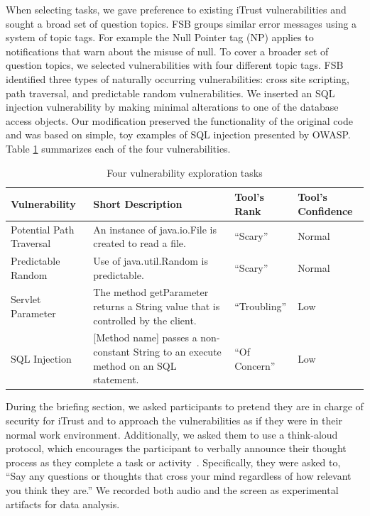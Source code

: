 \documentclass[conference]{IEEEtran}
\begin{document}
When selecting tasks, we gave preference to existing iTrust vulnerabilities and sought a broad set of question topics.  
FSB groups similar error messages using a system of topic tags. For example the Null Pointer tag (NP) applies to notifications that warn about the misuse of null. 
To cover a broader set of question topics, we selected vulnerabilities with four different topic tags.
FSB identified three types of naturally occurring vulnerabilities: cross site scripting, path traversal, and predictable random vulnerabilities.
We inserted an SQL injection vulnerability by making minimal alterations to one of the database access objects.
Our modification preserved the functionality of the original code and was based on simple, toy examples of SQL injection presented by OWASP.
Table \ref{table:vulnerabilities} summarizes each of the four vulnerabilities. 

\begin{table} 
\centering
\caption{Four vulnerability exploration tasks}
\begin{tabular}{|l|l|l|l|}
\rowcolor{gray!50}
\hline
    Vulnerability				& Short Description													& Tool's Rank 						& Tool's Confidence\\
    \hline	
    Potential Path Traversal	& An instance of java.io.File is created to read a file.     			& ``Scary''							 	&  Normal\\
    \hline
    Predictable Random			& Use of java.util.Random is predictable. 								& ``Scary''								&  Normal\\
    \hline
    Servlet Parameter 			& The method getParameter returns a String value that is controlled by the client.			& ``Troubling''		&  Low\\
    \hline
    SQL Injection				& [Method name] passes a non-constant String to an execute method on an SQL statement.     	& ``Of Concern''		&  Low\\
    \hline
\end{tabular}
\label{table:vulnerabilities}
\end{table}

During the briefing section, we asked participants to pretend they are in charge of security for iTrust and to approach the vulnerabilities as if they were in their normal work environment.
Additionally, we asked them to use a think-aloud protocol, which encourages the participant to verbally announce their thought process as they complete a task or activity~\cite{nielsen2002getting}. 
Specifically, they were asked to, ``Say any questions or thoughts that cross your mind regardless of how relevant you think they are.''
We recorded both audio and the screen as experimental artifacts for data analysis.
\end{document}
